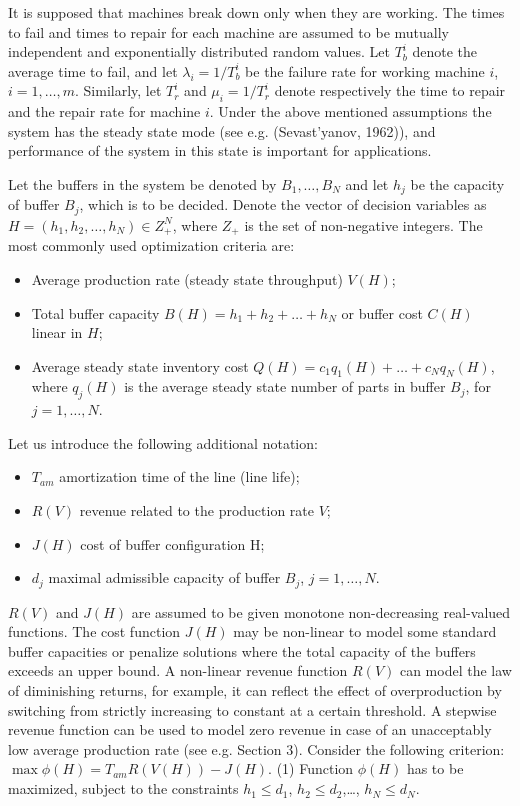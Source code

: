 \documentclass{ifacconf}
\begin{document}
It is supposed that machines break down only when they are working. The times to fail 
and  times  to  repair  for  each  machine  are  assumed  to  be  mutually  independent  and 
exponentially distributed random values. Let $T_b^i$ denote the average time to fail, and let 
$\lambda_i=1/T_b^i$ be the failure rate for working machine $i$, $i=1,…,m$. Similarly, let $T_r^i$ and $\mu_i=1/T_r^i$  
denote  respectively  the  time  to  repair  and  the repair rate for machine $i$. Under the 
above  mentioned  assumptions  the  system  has  the  steady  state  mode  (see  e.g. 
(Sevast'yanov,  1962)),  and  performance  of  the  system  in  this  state  is  important  for 
applications.

Let the buffers in the system be denoted by $B_1,…,B_N$ and let $h_j$ be the capacity of buffer 
$B_j$,  which  is  to  be  decided.  Denote  the  vector  of  decision  variables  as  $H=  (h_1,  h_2,…, h_N )\in  Z_+^N$,  where  $Z_+$  is  the  set  of  non-negative  integers.  The  most  commonly  used 
optimization criteria are:  
\begin{itemize}
\item Average production rate (steady state throughput) $V(H)$; 
\item Total buffer capacity $B(H)=h_1+h_2+…+h_N$ or buffer cost $C(H)$ linear in $H$;  
\item Average steady state inventory cost $Q(H)= c_1q_1(H)+ …+c_N q_N(H)$, where $q_j(H)$ is the average steady state number of parts in buffer $B_j$, for $j=1,…,N$. 
\end{itemize}

Let us introduce the following additional notation: 
\begin{itemize}
\item $T_{am}$  amortization time of the line (line life); 
\item $R(V)$  revenue related to the production rate $V$; 
\item $J(H)$ cost of buffer configuration H; 
\item $d_j$ maximal admissible capacity of buffer $B_j$, $j=1,…,N$.  
\end{itemize}

$R(V)$ and $J(H)$ are assumed to be given monotone non-decreasing real-valued functions. 
The cost function $J(H)$ may be non-linear to model some standard buffer capacities or 
penalize  solutions  where  the  total  capacity  of  the  buffers  exceeds  an  upper  bound. A 
non-linear revenue function $R(V)$ can model the law of diminishing returns, for example, 
it  can  reflect  the  effect  of  overproduction  by  switching  from  strictly  increasing  to 
constant at a certain threshold. A stepwise revenue function can be used to model zero 
revenue  in  case  of  an  unacceptably  low  average  production  rate  (see  e.g.  Section  3). 
Consider the following criterion: 
  $\max \phi(H)=T_{am} R(V(H)) - J(H)$.   (1) 
Function $\phi(H)$ has to be maximized, subject to the constraints $h_1 \leq d_1$, $h_2 \leq d_2$,…, $h_N \leq d_N$.
\end{document}
